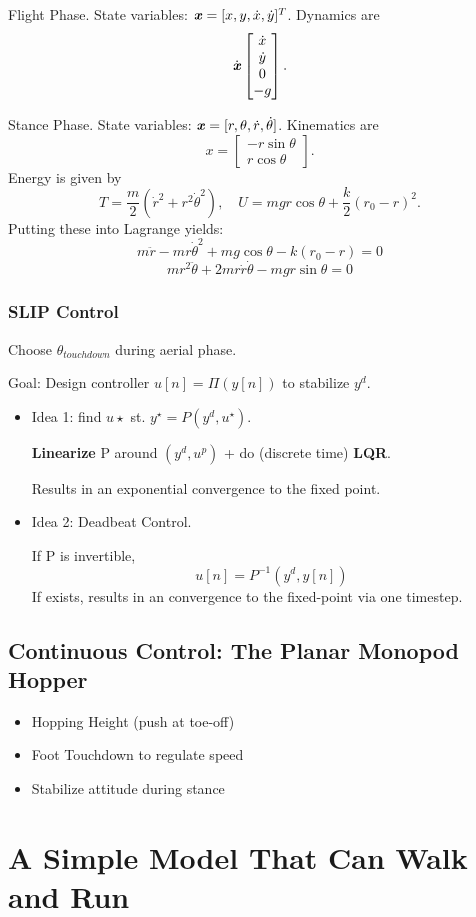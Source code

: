 Flight Phase. State variables: $\bm{\mathit{x}}=[x,y,\dot{x},\dot{y}]^T$. Dynamics are
$$\dot{\bm{\mathit{x}}}\begin{bmatrix} \dot{x} \\ \dot{y} \\ 0 \\ - g
      \end{bmatrix}.$$
      
Stance Phase. State variables: $\bm{\mathit{x}}=[r,\theta, \dot{r},\dot{\theta}]$. Kinematics are
$$x = \begin{bmatrix} - r \sin\theta \\ r
      \cos\theta \end{bmatrix}.$$
Energy is given by
$$T = \frac{m}{2}
      (\dot{r}^2 + r^2 \dot\theta^2 ), \quad U = mgr\cos\theta +
      \frac{k}{2}(r_0 - r)^2.$$
Putting these into Lagrange yields:
\begin{equation}
  m \ddot{r} - m r \dot\theta^2 + m g \cos\theta - k (r_0 -r) = 0  
\end{equation}
\begin{equation}
m r^2 \ddot{\theta} + 2mr\dot{r}\dot\theta - mgr \sin\theta = 0
\end{equation}
\subsubsection{SLIP Control}
Choose $\theta_{touchdown}$ during aerial phase. 

Goal: Design controller $u[n]=\Pi(y[n])$ to stabilize $y^d$.
\begin{itemize}
\item Idea 1: find $u\star$ st. $y^\star=P(y^d,u^\star)$. 

\textbf{Linearize} P around $(y^d, u^p)$ + do (discrete time) \textbf{LQR}.

Results in an exponential convergence to the fixed point. 
\item Idea 2: Deadbeat Control.

If P is invertible,
$$u[n]=P^{-1}(y^d,y[n])$$
If exists, results in an convergence to the fixed-point via one timestep.
\end{itemize}

\subsection{Continuous Control: The Planar Monopod Hopper}
\begin{itemize}
\item Hopping Height (push at toe-off)
\item Foot Touchdown to regulate speed
\item Stabilize attitude during stance
\end{itemize}

\section{A Simple Model That Can Walk and Run}







